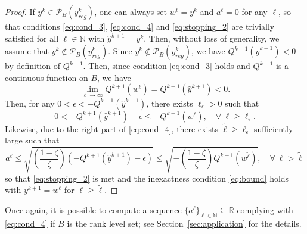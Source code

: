 \documentclass[pdflatex,sn-mathphys-num]{sn-jnl}
\numberwithin{equation}{section}%
\def\R{\mathbb{R}}
\def\N{\mathbb{N}}
\newcommand{\yck}{{y_{reg}^k}}
\theoremstyle{thmstyleone}%
\theoremstyle{thmstyletwo}%
\theoremstyle{thmstylethree}%
\begin{document}
\begin{proof}
If $y^k \in  \mathcal{P}_{B}(\yck)$,  one can always set $w^{\ell} = y^k$ and   $a^{\ell}=0$ for any $\ell$, so that conditions \eqref{eq:cond_3}, \eqref{eq:cond_4} and \eqref{eq:stopping_2} are trivially satisfied for all $\ell\in\N$ with $\hat{y}^{k+1}=y^k $. Then, without loss of generality, we assume that $y^k\notin \mathcal{P}_{B}(\yck)$.
Since $y^k \notin \mathcal{P}_B(\yck)$, we have $Q^{k+1}(\hat{y}^{k+1})<0$ by definition of $Q^{k+1}$. Then, since condition \eqref{eq:cond_3} holds and $Q^{k+1}$ is a continuous function on $B$, we have 
\begin{equation*}
    \lim_{\ell\rightarrow \infty}Q^{k+1}(w^{\ell})=Q^{k+1}(\hat{y}^{k+1})<0.
\end{equation*}
Then, for any $0<\epsilon<-Q^{k+1}(\hat{y}^{k+1})$, there exists $\ell_\epsilon>0$ such that
\begin{equation*}
    0<-Q^{k+1}(\hat{y}^{k+1})-\epsilon\leq -Q^{k+1}(w^\ell), \quad \forall \ \ell\geq \ell_{\epsilon}. 
\end{equation*}
Likewise, due to the right part of \eqref{eq:cond_4}, there exists $\tilde{\ell}\ge \ell_\epsilon$ sufficiently large such that
\begin{equation*}
    a^{{\ell}}\leq \sqrt{\left(\frac{1-\zeta}{\zeta}\right)(-Q^{k+1}(\hat{y}^{k+1})-\epsilon)}\leq\sqrt{-\left(\frac{1-\zeta}{\zeta}\right)Q^{k+1}(w^{\tilde{\ell}})}, \quad \forall \ \ell>\tilde \ell
\end{equation*}
so that \eqref{eq:stopping_2} is met and the inexactness condition \eqref{eq:bound} holds with $y^{k+1} = w^{{\ell}}$ for $\ell\ge \tilde \ell$.
\end{proof}
Once again, it is possible to compute a sequence $\{a^{\ell}\}_{\ell\in\N}\subseteq \R$ complying with \eqref{eq:cond_4} if $B$ is the rank level set; see Section~\ref{sec:application} for the details.
\end{document}
